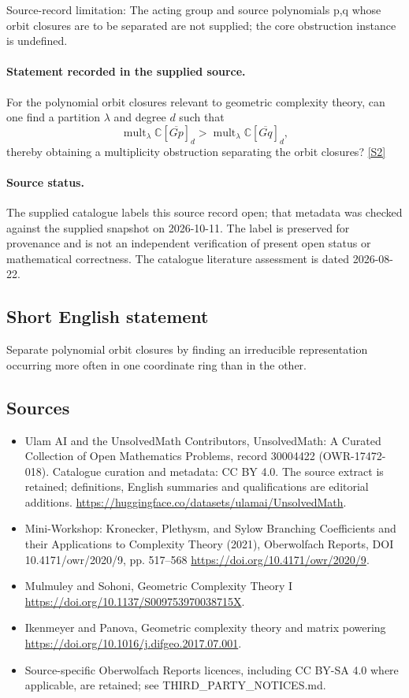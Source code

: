\documentclass[11pt]{article}
\begin{document}
Source-record limitation: The acting group and source polynomials p,q whose orbit closures are to be separated are not supplied; the core obstruction instance is undefined.
\paragraph{Statement recorded in the supplied source.}
For the polynomial orbit closures relevant to geometric complexity theory, can one find a partition $\lambda$ and degree $d$ such that
$$
\operatorname{mult}_\lambda\mathbb C[\overline{Gp}]_d>\operatorname{mult}_\lambda\mathbb C[\overline{Gq}]_d,
$$
thereby obtaining a multiplicity obstruction separating the orbit closures? \href{https://doi.org/10.4171/owr/2020/9}{[S2]}
\paragraph{Source status.}
The supplied catalogue labels this source record open; that metadata was checked against the supplied snapshot on 2026-10-11. The label is preserved for provenance and is not an independent verification of present open status or mathematical correctness. The catalogue literature assessment is dated 2026-08-22.
\subsection{Short English statement}
Separate polynomial orbit closures by finding an irreducible representation occurring more often in one coordinate ring than in the other.
\subsection{Sources}
\begin{itemize}
\item[S1] Ulam AI and the UnsolvedMath Contributors, UnsolvedMath: A Curated Collection of Open Mathematics Problems, record 30004422 (OWR-17472-018). Catalogue curation and metadata: CC BY 4.0. The source extract is retained; definitions, English summaries and qualifications are editorial additions.
\url{https://huggingface.co/datasets/ulamai/UnsolvedMath}.
\item[S2] Mini-Workshop: Kronecker, Plethysm, and Sylow Branching Coefficients and their Applications to Complexity Theory (2021), Oberwolfach Reports, DOI 10.4171/owr/2020/9, pp. 517--568
\url{https://doi.org/10.4171/owr/2020/9}.
\item[S3] Mulmuley and Sohoni, Geometric Complexity Theory I
\url{https://doi.org/10.1137/S009753970038715X}.
\item[S4] Ikenmeyer and Panova, Geometric complexity theory and matrix powering
\url{https://doi.org/10.1016/j.difgeo.2017.07.001}.
\item Source-specific Oberwolfach Reports licences, including CC BY-SA 4.0 where applicable, are retained; see THIRD\_PARTY\_NOTICES.md.
\end{itemize}
\end{document}
